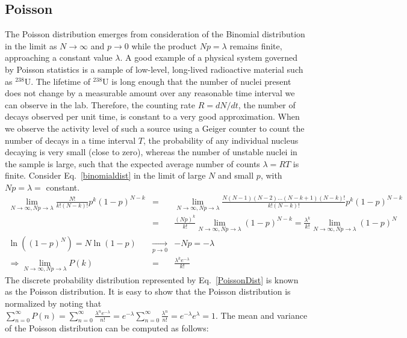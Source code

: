 \documentclass{revtex4}
\begin{document}
\subsection{Poisson}
The Poisson distribution emerges from consideration of the Binomial
distribution in the limit as $N \rightarrow \infty$ and $p \rightarrow
0$ while the product $Np = \lambda$ remains finite, approaching a
constant value $\lambda$. A good example of a physical system governed
by Poisson statistics is a sample of low-level, long-lived radioactive
material such as $^{238}$U. The lifetime of $^{238}$U is long enough
that the number of nuclei present does not change by a measurable
amount over any reasonable time interval we can observe in the
lab. Therefore, the counting rate $R = dN/dt$, the number of decays
observed per unit time, is constant to a very good approximation.  When we observe the activity level of such
a source using a Geiger counter to count the number of decays in a
time interval $T$, the probability of any individual nucleus decaying
is very small (close to zero), whereas the number of unstable nuclei
in the sample is large, such that the expected average number of counts
$\lambda = RT$ is finite. Consider Eq.~\eqref{binomialdist} in the
limit of large $N$ and small $p$, with $Np = \lambda = $ constant. 
\begin{eqnarray}
  \lim_{N \rightarrow \infty, Np \rightarrow \lambda}
  \frac{N!}{k!(N-k)!} p^k (1-p)^{N-k} &=& \lim_{N \rightarrow
    \infty,Np \rightarrow \lambda} \frac{N(N-1)(N-2)\ldots
    (N-k+1)(N-k)!}{k!(N-k)!}p^k(1-p)^{N-k} \nonumber \\
  &=& \frac{(Np)^k}{k!} \lim_{N\rightarrow \infty, Np \rightarrow \lambda} (1-p)^{N-k} =
  \frac{\lambda^k}{k!} \lim_{N\rightarrow \infty, Np\rightarrow \lambda} (1-p)^N \nonumber \\
 \ln \left((1-p)^N\right) = N \ln (1-p) &\xrightarrow[p \rightarrow 0]{}& -Np = -\lambda \nonumber \\
 \Rightarrow \lim_{N\rightarrow \infty,Np\rightarrow \lambda} P(k) &=&
 \frac{\lambda^k e^{-\lambda}}{k!} \label{PoissonDist}
\end{eqnarray}
The discrete probability distribution represented by
Eq.~\eqref{PoissonDist} is known as the Poisson distribution. It is
easy to show that the Poisson distribution is normalized by noting
that $\sum_{n=0}^\infty P(n) = \sum_{n=0}^\infty \frac{\lambda^n
  e^{-\lambda}}{n!} = e^{-\lambda} \sum_{n=0}^\infty
\frac{\lambda^n}{n!} = e^{-\lambda}e^\lambda = 1$. The mean
and variance of the Poisson distribution can be computed as follows:
\end{document}
